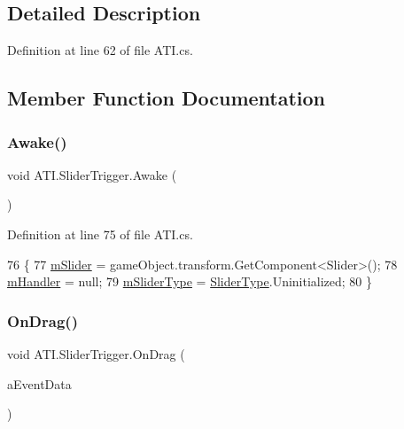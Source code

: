 \subsection{Detailed Description}


Definition at line 62 of file A\+T\+I.\+cs.



\subsection{Member Function Documentation}
\mbox{\label{class_a_t_i_1_1_slider_trigger_a03b00593630437fbf23973564ebd35ec}} 
\subsubsection{\texorpdfstring{Awake()}{Awake()}}
{\footnotesize\ttfamily void A\+T\+I.\+Slider\+Trigger.\+Awake (\begin{DoxyParamCaption}{ }\end{DoxyParamCaption})}



Definition at line 75 of file A\+T\+I.\+cs.


\begin{DoxyCode}
76         \{
77             \hyperlink{class_a_t_i_1_1_slider_trigger_adb4a609592234cac1451eeeb2d394740}{mSlider} = gameObject.transform.GetComponent<Slider>();
78             \hyperlink{class_a_t_i_1_1_slider_trigger_ab2c5ecc1828e1618dc7966aa815fdaba}{mHandler} = null;
79             \hyperlink{class_a_t_i_1_1_slider_trigger_a62a01bc9c41be54f58bd77664181fd5d}{mSliderType} = \hyperlink{class_a_t_i_ac4c6056a99cbd16ff0d292d33b038b9b}{SliderType}.Uninitialized;
80         \}
\end{DoxyCode}
\mbox{\label{class_a_t_i_1_1_slider_trigger_abed7a842d506b1f727b7e2b3cbb58aae}} 
\subsubsection{\texorpdfstring{On\+Drag()}{OnDrag()}}
{\footnotesize\ttfamily void A\+T\+I.\+Slider\+Trigger.\+On\+Drag (\begin{DoxyParamCaption}\item[{Pointer\+Event\+Data}]{a\+Event\+Data }\end{DoxyParamCaption})}



